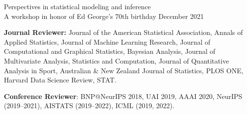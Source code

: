 \documentclass[margin]{res}
\begin{document}
\begin{resume}
Perspectives in statistical modeling and inference \\
A workshop in honor of Ed George's 70th birthday \hfill December 2021


\textbf{Journal Reviewer:} Journal of the American Statistical Association, Annals of Applied Statistics, Journal of Machine Learning Research, Journal of Computational and Graphical Statistics, Bayesian Analysis, Journal of Multivariate Analysis, Statistics and Computation, Journal of Quantitative Analysis in Sport, Australian \& New Zealand Journal of Statistics, PLOS ONE, Harvard Data Science Review, STAT. 

\textbf{Conference Reviewer}: BNP@NeurIPS 2018, UAI 2019, AAAI 2020,  NeurIPS (2019--2021), AISTATS (2019--2022), ICML (2019, 2022).
\end{resume} 
\end{document}
